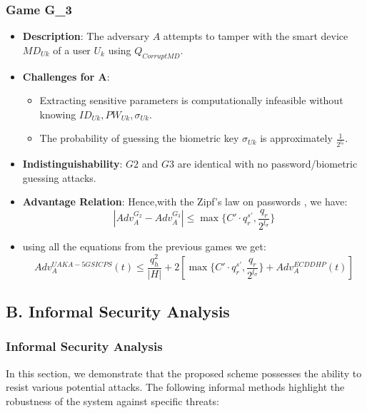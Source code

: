 \documentclass[9pt,handout]{beamer}
\begin{document}
\begin{frame}
    \frametitle{Game G_3}
    \begin{itemize}
        \item \textbf{Description}: The adversary \( A \) attempts to tamper with the smart device \( MD_{Uk} \) of a user \( U_k \) using \( Q_{CorruptMD} \).
        \item \textbf{Challenges for A}:
            \begin{itemize}
                \item Extracting sensitive parameters is computationally infeasible without knowing \( ID_{Uk}, PW_{Uk}, \sigma_{Uk} \).
                \item The probability of guessing the biometric key \( \sigma_{Uk} \) is approximately \( \frac{1}{2^{l_{\sigma}}} \).
            \end{itemize}
        \item \textbf{Indistinguishability}: \( G2 \) and \( G3 \) are identical with no password/biometric guessing attacks.
        \item \textbf{Advantage Relation}: Hence,with the Zipf’s law on passwords \cite{Wang2017}, we have: 
        \[
            |Adv_{A}^{G_2} - Adv_{A}^{G_3}| \leq \max\{C' \cdot q_r^{s'}, \frac{q_r}{2^{l_\sigma}} \}
        \]
        \item using all the equations from the previous games we get:
        \[
            Adv_{A}^{UAKA-5GSICPS}(t) \leq \frac{q_h^2}{|H|} + 2\left[\max\{C' \cdot q_r^{s'} , \frac{q_r}{2^{l_\sigma}}\} + Adv_A^{ECDDHP}(t)\right]
        \]
    \end{itemize}
\end{frame}

\subsection{B. Informal Security Analysis}
\begin{frame}
    \frametitle{Informal Security Analysis}
    In this section, we demonstrate that the proposed scheme possesses the ability to resist various potential attacks. 
    The following informal methods highlight the robustness of the system against specific threats:
\end{frame}
\end{document}
